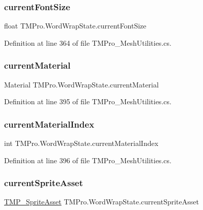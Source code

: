 \subsubsection{\texorpdfstring{currentFontSize}{currentFontSize}}
{\footnotesize\ttfamily float T\+M\+Pro.\+Word\+Wrap\+State.\+current\+Font\+Size}



Definition at line 364 of file T\+M\+Pro\+\_\+\+Mesh\+Utilities.\+cs.

\mbox{\label{struct_t_m_pro_1_1_word_wrap_state_ab65e034cc8bc9bb50359e02979818c71}} 
\subsubsection{\texorpdfstring{currentMaterial}{currentMaterial}}
{\footnotesize\ttfamily Material T\+M\+Pro.\+Word\+Wrap\+State.\+current\+Material}



Definition at line 395 of file T\+M\+Pro\+\_\+\+Mesh\+Utilities.\+cs.

\mbox{\label{struct_t_m_pro_1_1_word_wrap_state_adfb274db976183aac0e2e9394872a69c}} 
\subsubsection{\texorpdfstring{currentMaterialIndex}{currentMaterialIndex}}
{\footnotesize\ttfamily int T\+M\+Pro.\+Word\+Wrap\+State.\+current\+Material\+Index}



Definition at line 396 of file T\+M\+Pro\+\_\+\+Mesh\+Utilities.\+cs.

\mbox{\label{struct_t_m_pro_1_1_word_wrap_state_a5a7ba86c9aa5b718e7efd9c60a4aaaf6}} 
\subsubsection{\texorpdfstring{currentSpriteAsset}{currentSpriteAsset}}
{\footnotesize\ttfamily \mbox{\hyperlink{class_t_m_pro_1_1_t_m_p___sprite_asset}{T\+M\+P\+\_\+\+Sprite\+Asset}} T\+M\+Pro.\+Word\+Wrap\+State.\+current\+Sprite\+Asset}



